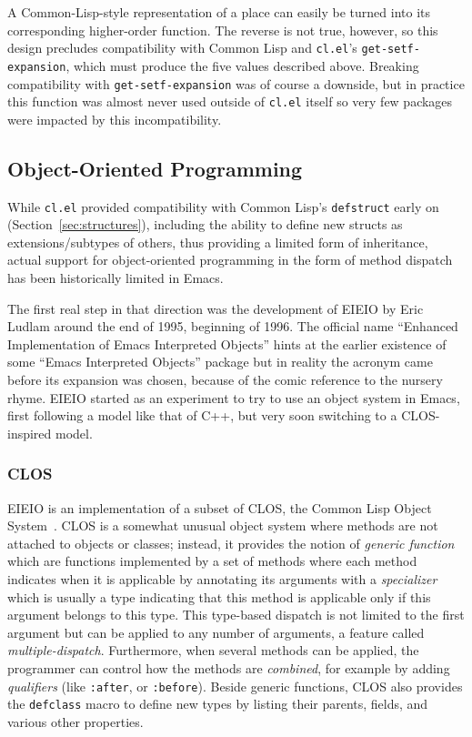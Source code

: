 \documentclass[format=acmsmall,screen]{acmart}
\begin{document}
A Common-Lisp-style representation of a place can easily be turned into
its corresponding higher-order function.  The reverse is not true, however, so
this design precludes compatibility with Common Lisp and
\texttt{cl.el}'s \texttt{get-setf-expansion}, which must produce the
five values described above.
Breaking compatibility with \texttt{get-setf-expansion}
was of course
a downside, but in practice this function was almost never used outside of
\texttt{cl.el} itself so very few packages were impacted by
this incompatibility.

\subsection{Object-Oriented Programming} %
\label{sec:oop}

While \texttt{cl.el} provided compatibility with Common
Lisp's \texttt{defstruct} early on (Section~\ref{sec:structures}), including the
ability to define new structs as extensions/subtypes of others, thus
providing a limited form of inheritance, actual support for object-oriented
programming in the form of method dispatch has been historically limited
in Emacs.

The first real step in that direction was the development of EIEIO by Eric
Ludlam around the end of 1995, beginning of 1996.  The official name ``Enhanced
Implementation of Emacs Interpreted Objects'' hints at the earlier existence
of some ``Emacs Interpreted Objects'' package but in reality the acronym
came before its expansion was chosen, because of the comic reference to the
nursery rhyme.
EIEIO started as an experiment to try to use
an object system in Emacs, first following a model like that of C++, but
very soon switching to a CLOS-inspired model.

\subsubsection{CLOS}

EIEIO is an implementation of a subset of CLOS, the Common Lisp Object
System~\cite{DeMichielGabriel1987}.  CLOS is a somewhat unusual object
system where methods are not attached to objects or classes; instead, it
provides the notion of \emph{generic function} which are functions
implemented by a set of methods where each method indicates when it is
applicable by annotating its arguments with a \emph{specializer} which is
usually a type indicating that this method is applicable only if this
argument belongs to this type.  This type-based dispatch is not limited to
the first argument but can be applied to any number of arguments, a feature
called \emph{multiple-dispatch}.  Furthermore, when several methods can be
applied, the programmer can control how the methods are \emph{combined}, for
example by adding \emph{qualifiers} (like \texttt{:after}, or
\texttt{:before}).  Beside generic functions, CLOS also provides the
\texttt{defclass} macro to define new types by listing their parents,
fields, and various other properties.
\end{document}
